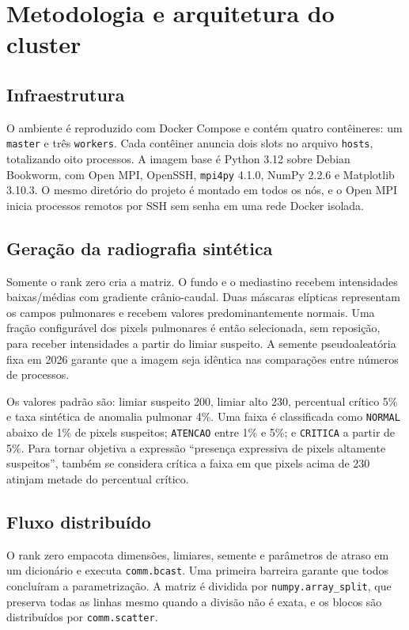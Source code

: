 \documentclass[12pt,a4paper]{article}
\begin{document}
\section{Metodologia e arquitetura do cluster}

\subsection{Infraestrutura}

O ambiente é reproduzido com Docker Compose e contém quatro contêineres: um
\texttt{master} e três \texttt{workers}. Cada contêiner anuncia dois slots no
arquivo \texttt{hosts}, totalizando oito processos. A imagem base é Python 3.12
sobre Debian Bookworm, com Open MPI, OpenSSH, \texttt{mpi4py} 4.1.0, NumPy 2.2.6
e Matplotlib 3.10.3. O mesmo diretório do projeto é montado em todos os nós, e o
Open MPI inicia processos remotos por SSH sem senha em uma rede Docker isolada.

\subsection{Geração da radiografia sintética}

Somente o rank zero cria a matriz. O fundo e o mediastino recebem intensidades
baixas/médias com gradiente crânio-caudal. Duas máscaras elípticas representam
os campos pulmonares e recebem valores predominantemente normais. Uma fração
configurável dos pixels pulmonares é então selecionada, sem reposição, para
receber intensidades a partir do limiar suspeito. A semente pseudoaleatória
fixa em 2026 garante que a imagem seja idêntica nas comparações entre números de
processos.

Os valores padrão são: limiar suspeito 200, limiar alto 230, percentual crítico
5\% e taxa sintética de anomalia pulmonar 4\%. Uma faixa é classificada como
\texttt{NORMAL} abaixo de 1\% de pixels suspeitos; \texttt{ATENCAO} entre 1\% e
5\%; e \texttt{CRITICA} a partir de 5\%. Para tornar objetiva a expressão
``presença expressiva de pixels altamente suspeitos'', também se considera
crítica a faixa em que pixels acima de 230 atinjam metade do percentual crítico.

\subsection{Fluxo distribuído}

O rank zero empacota dimensões, limiares, semente e parâmetros de atraso em um
dicionário e executa \texttt{comm.bcast}. Uma primeira barreira garante que
todos concluíram a parametrização. A matriz é dividida por
\texttt{numpy.array\_split}, que preserva todas as linhas mesmo quando a divisão
não é exata, e os blocos são distribuídos por \texttt{comm.scatter}.
\end{document}
